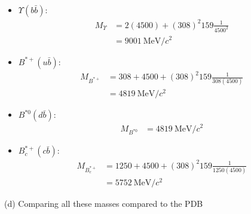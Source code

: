 \documentclass[../main.tex]{subfiles}
\begin{document}
\begin{itemize}
    \item $\Upsilon(b\bar b)$:
    \begin{align*}
        M_{\Upsilon} &= 2(4500) + (308)^2 159 \frac{1}{4500^2} \\
        &= \qty{9001}{\MeV/c^2}
    \end{align*}
    \item $B^{*+}(u \bar b)$:
    \begin{align*}
        M_{B^{*+}} &= 308 + 4500 + (308)^2 159 \frac{1}{308(4500)} \\
        &= \qty{4819}{\MeV/c^2}
    \end{align*}
    \item $B^{*0}(d \bar b)$:
    \begin{align*}
        M_{B^{*0}} &= \qty{4819}{\MeV/c^2}
    \end{align*}
    \item $B_c^{*+}(c \bar b)$:
    \begin{align*}
        M_{B_c^{*+}} &= 1250 + 4500 + (308)^2 159 \frac{1}{1250(4500)} \\
        &= \qty{5752}{\MeV/c^2}
    \end{align*}
\end{itemize}
(d) Comparing all these masses compared to the PDB
\end{document}
